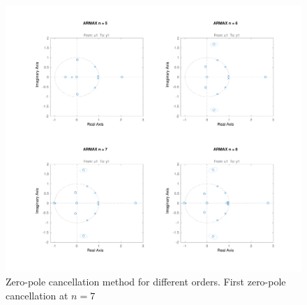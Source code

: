 \documentclass[a4paper,11pt]{article}
\begin{document}
\begin{figure}[H]
\centering
\includegraphics[width=\textwidth]{images/3_zero_pole_cancel}
\caption{Zero-pole cancellation method for different orders. First zero-pole cancellation at $n = 7$}
\label{fig:zpc}
\end{figure}
\end{document}
